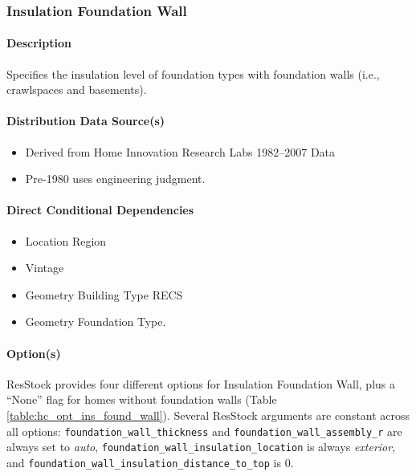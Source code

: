 \subsubsection{Insulation Foundation Wall}\label{insulation_foundation_wall}
\paragraph{Description}
Specifies the insulation level of foundation types with foundation walls (i.e., crawlspaces and basements).

\paragraph{Distribution Data Source(s)}
\begin{itemize}
 
\item
  Derived from Home Innovation Research Labs 1982--2007 Data
\item
  Pre-1980 uses engineering judgment.
\end{itemize}
\paragraph{Direct Conditional Dependencies}

\begin{itemize}
    \item Location Region
    \item Vintage
    \item Geometry Building Type RECS
    \item Geometry Foundation Type.
\end{itemize}
\paragraph{Option(s)}
ResStock provides four different options for Insulation Foundation Wall, plus a ``None'' flag for homes without foundation walls (Table \ref{table:hc_opt_ins_found_wall}). Several ResStock arguments are constant across all options: 
\texttt{foundation\_wall\_thickness} and \texttt{foundation\_wall\_assembly\_r} are always set to \textit{auto}, \texttt{foundation\_wall\_insulation\_location} is always \textit{exterior}, and \texttt{foundation\_wall\_insulation\_distance\_to\_top}  is 0. 

